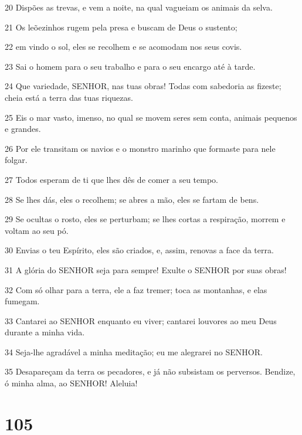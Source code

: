 \par 20 Dispões as trevas, e vem a noite, na qual vagueiam os animais da selva.
\par 21 Os leõezinhos rugem pela presa e buscam de Deus o sustento;
\par 22 em vindo o sol, eles se recolhem e se acomodam nos seus covis.
\par 23 Sai o homem para o seu trabalho e para o seu encargo até à tarde.
\par 24 Que variedade, SENHOR, nas tuas obras! Todas com sabedoria as fizeste; cheia está a terra das tuas riquezas.
\par 25 Eis o mar vasto, imenso, no qual se movem seres sem conta, animais pequenos e grandes.
\par 26 Por ele transitam os navios e o monstro marinho que formaste para nele folgar.
\par 27 Todos esperam de ti que lhes dês de comer a seu tempo.
\par 28 Se lhes dás, eles o recolhem; se abres a mão, eles se fartam de bens.
\par 29 Se ocultas o rosto, eles se perturbam; se lhes cortas a respiração, morrem e voltam ao seu pó.
\par 30 Envias o teu Espírito, eles são criados, e, assim, renovas a face da terra.
\par 31 A glória do SENHOR seja para sempre! Exulte o SENHOR por suas obras!
\par 32 Com só olhar para a terra, ele a faz tremer; toca as montanhas, e elas fumegam.
\par 33 Cantarei ao SENHOR enquanto eu viver; cantarei louvores ao meu Deus durante a minha vida.
\par 34 Seja-lhe agradável a minha meditação; eu me alegrarei no SENHOR.
\par 35 Desapareçam da terra os pecadores, e já não subsistam os perversos. Bendize, ó minha alma, ao SENHOR! Aleluia!

\chapter{105}

